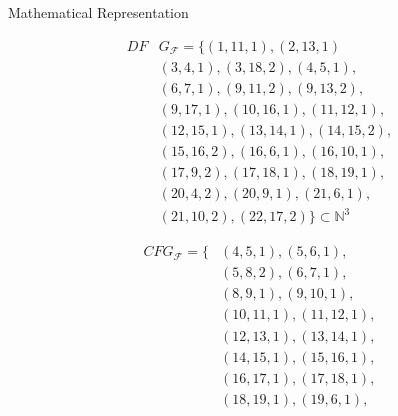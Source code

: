\begin{blackbox}{Mathematical Representation}
    \centering
    \begin{minipage}{0.329\textwidth}
        \begin{graybox}
            \scriptsize
            \setlength{\abovedisplayskip}{0pt}
            \setlength{\belowdisplayskip}{0pt}
            \vspace{-0.5em}
            \begin{align*}
                DF&G_\mathcal F=\{(1,11,1),(2,13,1)\\[-0.5em]
                  &(3,4,1),(3,18,2),(4,5,1),\\[-0.5em]
                  &(6,7,1),(9,11,2),(9,13,2),\\[-0.5em]
                  &(9,17,1),(10,16,1),(11,12,1),\\[-0.5em]
                  &(12,15,1),(13,14,1),(14,15,2),\\[-0.5em]
                  &(15,16,2),(16,6,1),(16,10,1),\\[-0.5em]
                  &(17,9,2),(17,18,1),(18,19,1),\\[-0.5em]
                  &(20,4,2),(20,9,1),(21,6,1),\\[-0.5em]
                  &(21,10,2),(22,17,2)\}\subset\mathbb N^3
            \end{align*}
        \end{graybox}
    \end{minipage}
    \begin{minipage}{0.329\textwidth}
        \begin{graybox}
            \scriptsize
            \setlength{\abovedisplayskip}{0pt}
            \setlength{\belowdisplayskip}{0pt}
            \vspace{-0.5em}
            \begin{align*}
                CFG_\mathcal F=\{&(4,5,1),(5,6,1),\\[-0.5em]
                  &(5,8,2),(6,7,1),\\[-0.5em]
                  &(8,9,1),(9,10,1),\\[-0.5em]
                  &(10,11,1),(11,12,1),\\[-0.5em]
                  &(12,13,1),(13,14,1),\\[-0.5em]
                  &(14,15,1),(15,16,1),\\[-0.5em]
                  &(16,17,1),(17,18,1),\\[-0.5em]
                  &(18,19,1),(19,6,1),\\[-0.5em]

\end{align*}
\end{graybox}
\end{minipage}
\end{blackbox}
